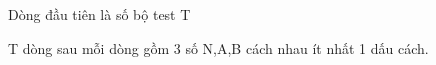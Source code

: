 Dòng đầu tiên là số bộ test T  

   T dòng sau mỗi dòng gồm 3 số N,A,B cách nhau ít nhất 1 dấu cách.
